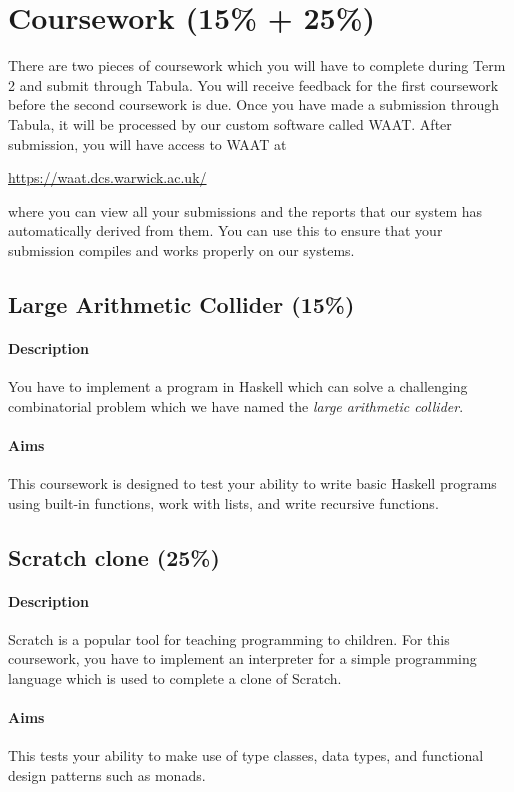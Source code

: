 \pagebreak
\section{Coursework (15\% + 25\%)}

There are two pieces of coursework which you will have to complete during Term 2 and submit through Tabula. You will receive feedback for the first coursework before the second coursework is due. Once you have made a submission through Tabula, it will be processed by our custom software called WAAT. After submission, you will have access to WAAT at
\begin{center}
	\url{https://waat.dcs.warwick.ac.uk/}
\end{center}
where you can view all your submissions and the reports that our system has automatically derived from them. You can use this to ensure that your submission compiles and works properly on our systems. 

\subsection{Large Arithmetic Collider (15\%)}

\paragraph{Description} You have to implement a program in Haskell which can solve a challenging combinatorial problem which we have named the \emph{large arithmetic collider}. 

\paragraph{Aims} This coursework is designed to test your ability to write basic Haskell programs using built-in functions, work with lists, and write recursive functions. 

\subsection{Scratch clone (25\%)}

\paragraph{Description} Scratch is a popular tool for teaching programming to children. For this coursework, you have to implement an interpreter for a simple programming language which is used to complete a clone of Scratch. 

\paragraph{Aims} This tests your ability to make use of type classes, data types, and functional design patterns such as monads.